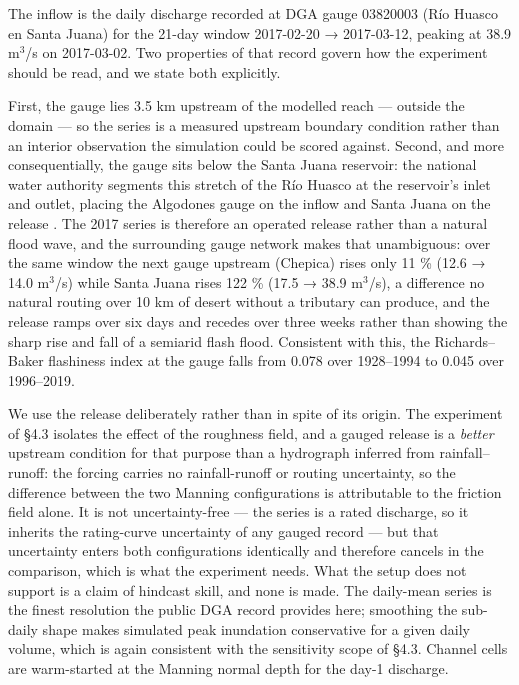 The inflow is the daily discharge recorded at DGA gauge 03820003 (Río
Huasco en Santa Juana) for the 21-day window 2017-02-20 → 2017-03-12,
peaking at 38.9 m$^{3}$/s on 2017-03-02. Two properties of that record govern
how the experiment should be read, and we state both explicitly.

First, the gauge lies 3.5 km upstream of the modelled reach --- outside
the domain --- so the series is a measured upstream boundary condition
rather than an interior observation the simulation could be scored
against. Second, and more consequentially, the gauge sits below the
Santa Juana reservoir: the national water authority segments this
stretch of the Río Huasco at the reservoir's inlet and outlet, placing
the Algodones gauge on the inflow and Santa Juana on the release
\citep{DGA2004Huasco}. The 2017 series is therefore an operated release
rather than a natural flood wave, and the surrounding gauge network
makes that unambiguous: over the same window the next gauge upstream
(Chepica) rises only 11 \% (12.6 → 14.0 m$^{3}$/s) while Santa Juana rises
122 \% (17.5 → 38.9 m$^{3}$/s), a difference no natural routing over 10 km of
desert without a tributary can produce, and the release ramps over six
days and recedes over three weeks rather than showing the sharp rise and
fall of a semiarid flash flood. Consistent with this, the
Richards--Baker flashiness index at the gauge falls from 0.078 over
1928--1994 to 0.045 over 1996--2019.

We use the release deliberately rather than in spite of its origin. The
experiment of §4.3 isolates the effect of the roughness field, and a
gauged release is a \emph{better} upstream condition for that purpose
than a hydrograph inferred from rainfall--runoff: the forcing carries no
rainfall-runoff or routing uncertainty, so the difference between the
two Manning configurations is attributable to the friction field alone.
It is not uncertainty-free --- the series is a rated discharge, so it
inherits the rating-curve uncertainty of any gauged record --- but that
uncertainty enters both configurations identically and therefore cancels
in the comparison, which is what the experiment needs. What the setup
does not support is a claim of hindcast skill, and none is made. The
daily-mean series is the finest resolution the public DGA record
provides here; smoothing the sub-daily shape makes simulated peak
inundation conservative for a given daily volume, which is again
consistent with the sensitivity scope of §4.3. Channel cells are
warm-started at the Manning normal depth for the day-1 discharge.

